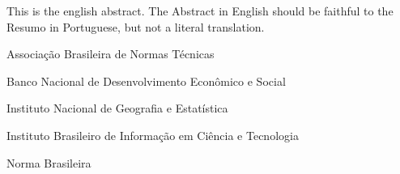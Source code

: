 \documentclass[
	12pt,				%
	openright,			%
	oneside,			%
	a4paper,			%
	dissertacao,			%
	]{ABNT-DC-UEL}
\begin{document}
\begin{Abstract}
 This is the english abstract. The Abstract in English should be faithful to the
 Resumo in Portuguese, but not a literal translation.
\end{Abstract}

\listoffigures*
\cleardoublepage

\listoftables*
\cleardoublepage

\begin{siglas}
  \item[ABNT] Associação Brasileira de Normas Técnicas
  \item[BNDES] Banco Nacional de Desenvolvimento Econômico e Social
  \item[IBGE] Instituto Nacional de Geografia e Estatística
  \item[IBICT] Instituto Brasileiro de Informação em Ciência e Tecnologia
  \item[NBR] Norma Brasileira
\end{siglas}


\tableofcontents*
\cleardoublepage



\textual
\pagestyle{dc-uel-header} %


\end{document}
